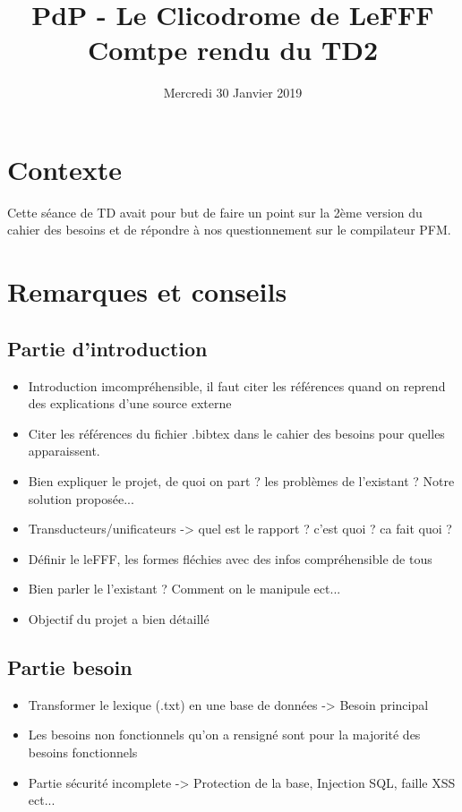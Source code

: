 \documentclass{article}
\title{PdP - Le Clicodrome de LeFFF \\ Comtpe rendu du TD2}
\author{}
\date{Mercredi 30 Janvier 2019}
\begin{document}
\maketitle

\section{Contexte}
Cette séance de TD avait pour but de faire un point sur la 2ème version du cahier des besoins et de répondre à nos questionnement sur le compilateur PFM.

\section{Remarques et conseils}
\subsection{Partie d'introduction}
\begin{itemize}
    \item Introduction imcompréhensible, il faut citer les références quand on reprend des explications d'une source externe
    \item Citer les références du fichier .bibtex dans le cahier des besoins pour quelles apparaissent.
    \item Bien expliquer le projet, de quoi on part ? les problèmes de l'existant ? Notre solution proposée...
    \item Transducteurs/unificateurs -> quel est le rapport ? c'est quoi ? ca fait quoi ?
    \item Définir le leFFF, les formes fléchies avec des infos compréhensible de tous
    \item Bien parler le l'existant ? Comment on le manipule ect...
    \item Objectif du projet a bien détaillé
\end{itemize}

\subsection{Partie besoin}
\begin{itemize}
    \item Transformer le lexique (.txt) en une base de données -> Besoin principal
    \item Les besoins non fonctionnels qu'on a rensigné sont pour la majorité des besoins fonctionnels
    \item Partie sécurité incomplete -> Protection de la base, Injection SQL, faille XSS ect...
\end{itemize}
\end{document}
